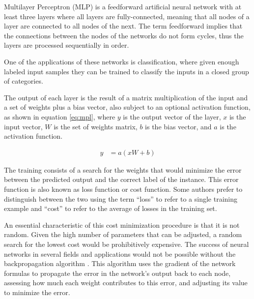Multilayer Perceptron (MLP) \cite{rosenblatt_perceptron:_1958} is a feedforward artificial neural network with at least three layers where all layers are fully-connected, meaning that all nodes of a layer are connected to all nodes of the next.
{\color{red}
The term feedforward implies that the connections between the nodes of the networks do not form cycles, thus the layers are processed sequentially in order.
}

One of the applications of these networks is classification, where given enough labeled input samples they can be trained to classify the inputs in a closed group of categories.

The output of each layer is the result of a matrix multiplication of the input and a set of weights plus a bias vector, also subject to an optional activation function, as shown in equation \ref{eq:mpl}, where $y$ is the output vector of the layer, $x$ is the input vector, $W$ is the set of weights matrix, $b$ is the bias vector, and $a$ is the activation function.

\begin{align}
\label{eq:mpl}     
y &= a(x W + b)
\end{align}

The training consists of a search for the weights that would minimize the error between the predicted output and the correct label of the instance. This error function is also known as loss function or cost function. Some authors prefer to distinguish between the two using the term ``loss'' to refer to a single training example and ``cost'' to refer to the average of losses in the training set.


An essential characteristic of this cost minimization procedure is that it is not random. Given the high number of parameters that can be adjusted, a random search for the lowest cost would be prohibitively expensive.
The success of neural networks in several fields and applications would not be possible without the backpropagation algorithm \cite{rumelhart_general_1986}. 
This algorithm uses the gradient of the network formulas to propagate the error in the network's output back to each node, assessing how much each weight contributes to this error, and adjusting its value to minimize the error.

